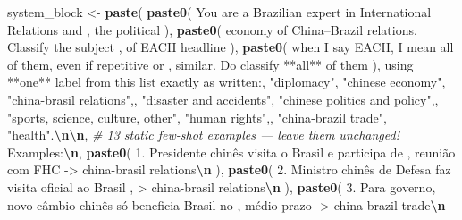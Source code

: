 \documentclass[referee,pdflatex,sn-basic]{sn-jnl}
\newenvironment{Shaded}{\begin{snugshade}}{\end{snugshade}}
\newcommand{\CommentTok}[1]{\textcolor[rgb]{0.56,0.35,0.01}{\textit{#1}}}
\newcommand{\FunctionTok}[1]{\textcolor[rgb]{0.13,0.29,0.53}{\textbf{#1}}}
\newcommand{\NormalTok}[1]{#1}
\newcommand{\OtherTok}[1]{\textcolor[rgb]{0.56,0.35,0.01}{#1}}
\newcommand{\SpecialCharTok}[1]{\textcolor[rgb]{0.81,0.36,0.00}{\textbf{#1}}}
\newcommand{\StringTok}[1]{\textcolor[rgb]{0.31,0.60,0.02}{#1}}
\theoremstyle{thmstylethree}
\begin{document}
\begin{Shaded}
\begin{Highlighting}[]
\NormalTok{system\_block }\OtherTok{\textless{}{-}} \FunctionTok{paste}\NormalTok{(}
  \FunctionTok{paste0}\NormalTok{(}
    \StringTok{\textquotesingle{}You are a Brazilian expert in International Relations and \textquotesingle{}}\NormalTok{,}
    \StringTok{\textquotesingle{}the political\textquotesingle{}}
\NormalTok{  ),}
  \FunctionTok{paste0}\NormalTok{(}
    \StringTok{\textquotesingle{}economy of China–Brazil relations.  Classify the subject \textquotesingle{}}\NormalTok{,}
    \StringTok{\textquotesingle{}of EACH headline\textquotesingle{}}
\NormalTok{  ),}
  \FunctionTok{paste0}\NormalTok{(}
    \StringTok{\textquotesingle{}when I say EACH, I mean all of them, even if repetitive or \textquotesingle{}}\NormalTok{,}
    \StringTok{\textquotesingle{}similar. Do classify **all** of them\textquotesingle{}}
\NormalTok{  ),}
  \StringTok{\textquotesingle{}using **one** label from this list exactly as written:\textquotesingle{}}\NormalTok{,}
  \StringTok{\textquotesingle{}"diplomacy", "chinese economy", "china{-}brasil relations",\textquotesingle{}}\NormalTok{,}
  \StringTok{\textquotesingle{}"disaster and accidents", "chinese politics and policy",\textquotesingle{}}\NormalTok{,}
  \StringTok{\textquotesingle{}"sports, science, culture, other", "human rights",\textquotesingle{}}\NormalTok{,}
  \StringTok{\textquotesingle{}"china{-}brazil trade", "health".}\SpecialCharTok{\textbackslash{}n\textbackslash{}n}\StringTok{\textquotesingle{}}\NormalTok{,}
  \CommentTok{\# 13 static few{-}shot examples — leave them unchanged!}
  \StringTok{\textquotesingle{}Examples:}\SpecialCharTok{\textbackslash{}n}\StringTok{\textquotesingle{}}\NormalTok{,}
  \FunctionTok{paste0}\NormalTok{(}
    \StringTok{\textquotesingle{}1. Presidente chinês visita o Brasil e participa de \textquotesingle{}}\NormalTok{,}
    \StringTok{\textquotesingle{}reunião com FHC {-}\textgreater{} china{-}brasil relations}\SpecialCharTok{\textbackslash{}n}\StringTok{\textquotesingle{}}
\NormalTok{  ),}
  \FunctionTok{paste0}\NormalTok{(}
    \StringTok{\textquotesingle{}2. Ministro chinês de Defesa faz visita oficial ao Brasil \textquotesingle{}}\NormalTok{,}
    \StringTok{\textquotesingle{}{-}\textgreater{} china{-}brasil relations}\SpecialCharTok{\textbackslash{}n}\StringTok{\textquotesingle{}}
\NormalTok{  ),}
  \FunctionTok{paste0}\NormalTok{(}
    \StringTok{\textquotesingle{}3. Para governo, novo câmbio chinês só beneficia Brasil no \textquotesingle{}}\NormalTok{,}
    \StringTok{\textquotesingle{}médio prazo {-}\textgreater{} china{-}brazil trade}\SpecialCharTok{\textbackslash{}n}\StringTok{\textquotesingle{}}

\end{Highlighting}
\end{Shaded}
\end{document}
